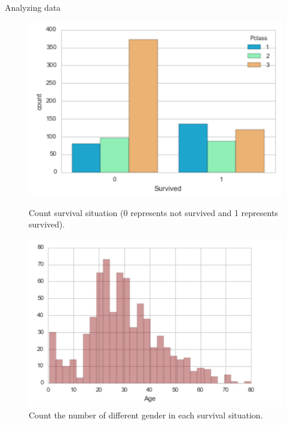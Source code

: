 \documentclass[a4paper,12pt]{article}
\begin{document}
\begin{section}{Analyzing data}
\begin{figure}
\centering
\begin{minipage}{.5\textwidth}
  \includegraphics[width=\textwidth]{pclass_survive.png}
  \caption{Count survival situation (0 represents not survived and 1 represents survived).}
\end{minipage}%
\hfill
\begin{minipage}{.5\textwidth}
  \includegraphics[width=\textwidth]{age.png}
  \caption{Count the number of different gender in each survival situation.}
\end{minipage}
\end{figure}



\end{section}
\end{document}
